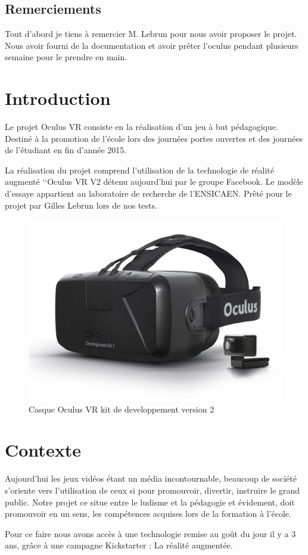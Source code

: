 \documentclass[a4paper,11pt]{myreport}
\begin{document}
\setlength{\textheight}{26cm}
\setlength{\topmargin}{-2cm}

\tableofcontents


\listoffigures
\section*{Remerciements}
Tout d'abord je tiens à remercier M. Lebrun pour nous avoir proposer le projet. Nous avoir fourni de la documentation et avoir prêter l'oculus pendant plusieurs semaine pour le prendre en main.
\chapter{Introduction}
\par Le projet Oculus VR consiste en la réalisation d'un jeu à but pédagogique. Destiné à la promotion de l'école lors des journées portes ouvertes et des journées de l'étudiant en fin d'année 2015.
\par La réalisation du projet comprend l'utilisation de la technologie de réalité augmenté \lq\lq{Oculus VR V2} détenu aujourd'hui par le groupe Facebook. Le modèle d'essaye appartient au laboratoire de recherche de l'ENSICAEN. Prêté pour le projet par Gilles Lebrun lors de nos tests.
\begin{figure}[h]
	\includegraphics[scale=0.70]{./images/dk2-product.jpg}
	\caption{Casque Oculus VR kit de developpement version 2}
\end{figure}
\chapter{Contexte}
\par Aujourd'hui les jeux vidéos étant un média incontournable, beaucoup de société s'oriente vers l'utilisation de ceux si pour promouvoir, divertir, instruire le grand public. Notre projet ce situe entre le ludisme et la pédagogie et évidement, doit promouvoir en un sens, les compétences acquises lors de la formation à l'école.
\par Pour ce faire nous avons accès à une technologie remise au goût du jour il y a 3 ans, grâce à une campagne Kickstarter : La réalité augmentée.
\end{document}
